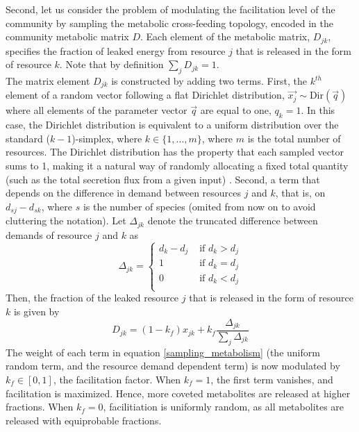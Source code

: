 \documentclass[12pt]{article}
\begin{document}
        	Second, let us consider the problem of modulating the facilitation level of the community by sampling the metabolic cross-feeding topology, encoded in the community metabolic matrix $ D $. Each element of the metabolic matrix, $ D_{jk} $, specifies the fraction of leaked energy from resource $ j $ that is released in the form of resource $ k $. Note that by definition $ \sum_jD_{jk} = 1 $.\\ 
        	The matrix element $ D_{jk} $ is constructed by adding two terms. First, the $ k^{th} $ element of a random vector following a flat Dirichlet distribution, $ \vec{x_j} \sim \text{Dir}(\vec{q})$ where all elements of the parameter vector $ \vec{q} $ are equal to one, $ q_k = 1 $. In this case, the Dirichlet distribution is equivalent to a uniform distribution over the standard ($ k  - 1 $)-simplex, where $ k \in \{1, \dots, m\} $, where $m$ is the total number of resources. The Dirichlet distribution has the property that each sampled vector sums to 1, making it a natural way of randomly allocating a fixed total quantity (such as the total secretion flux from a given input) \citep{Marsland2020}. Second, a term that depends on the difference in demand between resources $ j $ and $ k $, that is, on $ d_{sj} - d_{sk}$, where $ s $ is the number of species (omited from now on to avoid cluttering the notation). Let $ \Delta_{jk} $ denote the truncated difference between demands of resource $ j $ and $ k $ as
        	\begin{equation}
        		\Delta_{jk} = 
        			\begin{cases}
        				d_k - d_j & \text{ if } d_k > d_j\\
        				1 & \text{ if } d_k = d_j\\
        				0 & \text{ if } d_k < d_j\\
        			\end{cases}
        	\end{equation}
        	Then, the fraction of the leaked resource $ j $ that is released in the form of resource $ k $ is given by
        	\begin{equation}\label{sampling_metabolism}
        		D_{jk} = (1-k_f)x_{jk} + k_f\frac{\Delta_{jk}}{\sum_j\Delta_{jk}}
        	\end{equation}
        	The weight of each term in equation \ref{sampling_metabolism} (the uniform random term, and the resource demand dependent term) is now modulated by $ k_f \in [0, 1]$, the facilitation factor. When $ k_f = 1 $, the first term  vanishes, and facilitation is maximized. Hence, more coveted metabolites are released at higher fractions. When $ k_f = 0 $, facilitiation is uniformly random, as all metabolites are released with equiprobable fractions.\par\\
        
\end{document}
